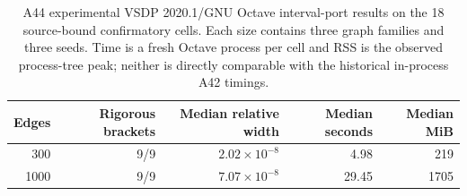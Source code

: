\begin{table}[t]
\centering
\caption{A44 experimental VSDP 2020.1/GNU Octave interval-port results on
the 18 source-bound confirmatory cells.  Each size contains three graph
families and three seeds.  Time is a fresh Octave process per cell and RSS is
the observed process-tree peak; neither is directly comparable with the
historical in-process A42 timings.}
\label{tab:vsdp-port-a44}
\small
\begin{tabular}{rrrrr}
\toprule
Edges & Rigorous brackets & Median relative width & Median seconds & Median MiB \\
\midrule
300  & 9/9 & $2.02\times10^{-8}$ & 4.98 & 219 \\
1000 & 9/9 & $7.07\times10^{-8}$ & 29.45 & 1705 \\
\bottomrule
\end{tabular}
\end{table}
